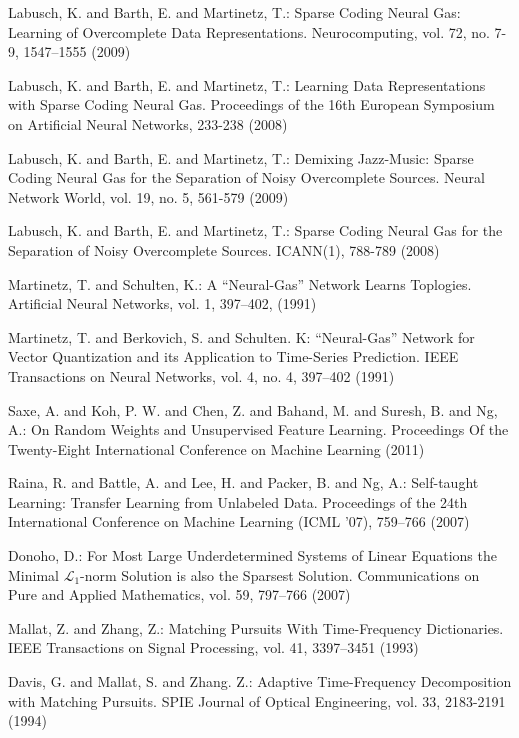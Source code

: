 \documentclass[runningheads,a4paper]{llncs}
\begin{document}
\begin{thebibliography}{4}
 Labusch, K. and Barth, E. and Martinetz, T.: Sparse Coding Neural Gas: Learning of Overcomplete Data Representations. Neurocomputing, vol. 72, no. 7-9, 1547--1555 (2009)

 Labusch, K. and Barth, E. and Martinetz, T.: Learning Data Representations with Sparse Coding Neural Gas. Proceedings of the 16th European Symposium on Artificial Neural Networks, 233-238 (2008)

 Labusch, K. and Barth, E. and Martinetz, T.: Demixing Jazz-Music: Sparse Coding Neural Gas for the Separation of Noisy Overcomplete Sources. Neural Network World, vol. 19, no. 5, 561-579 (2009)

 Labusch, K. and Barth, E. and Martinetz, T.: Sparse Coding Neural Gas for the Separation of Noisy Overcomplete Sources. ICANN(1), 788-789 (2008)

 Martinetz, T. and Schulten, K.: A ``Neural-Gas'' Network Learns Toplogies. Artificial Neural Networks, vol. 1, 397--402, (1991)

 Martinetz, T. and Berkovich, S. and Schulten. K: ``Neural-Gas'' Network for Vector Quantization and its Application to Time-Series Prediction. IEEE Transactions on Neural Networks, vol. 4, no. 4, 397--402 (1991)

 Saxe, A. and Koh, P. W. and Chen, Z. and Bahand, M. and Suresh, B. and Ng, A.: On Random Weights and Unsupervised Feature Learning. Proceedings Of the Twenty-Eight International Conference on Machine Learning (2011)

 Raina, R. and Battle, A. and Lee, H. and Packer, B. and Ng, A.: Self-taught Learning: Transfer Learning from Unlabeled Data. Proceedings of the 24th International Conference on Machine Learning (ICML '07), 759--766 (2007)

 Donoho, D.: For Most Large Underdetermined Systems of Linear Equations the Minimal $\mathcal{L}_1$-norm Solution is also the Sparsest Solution. Communications on Pure and Applied Mathematics, vol. 59, 797--766 (2007)

 Mallat, Z. and Zhang, Z.: Matching Pursuits With Time-Frequency Dictionaries. IEEE Transactions on Signal Processing, vol. 41, 3397--3451 (1993)

 Davis, G. and Mallat, S. and Zhang. Z.: Adaptive Time-Frequency Decomposition with Matching Pursuits. SPIE Journal of Optical Engineering, vol. 33, 2183-2191 (1994)


\end{thebibliography}
\end{document}
